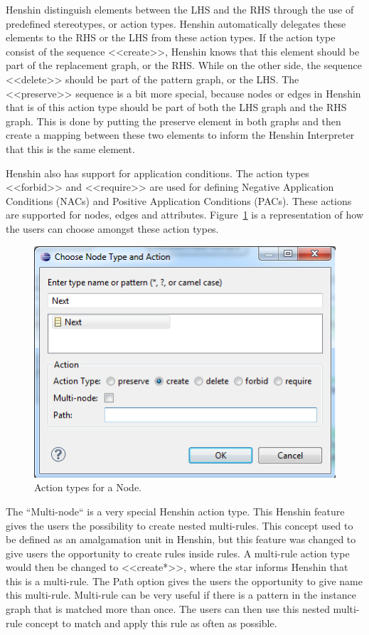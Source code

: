 Henshin distinguish elements between the LHS and the RHS through the
use of predefined stereotypes, or action types. Henshin automatically delegates
these elements to the RHS or the LHS from these action types. If the action type
consist of the sequence <<create>>, Henshin knows that this element should be
part of the replacement graph, or the RHS. While on the other side, the sequence
<<delete>> should be part of the pattern graph, or the LHS. The <<preserve>>
sequence is a bit more special, because nodes or edges in Henshin that is of
this action type should be part of both the LHS graph and the RHS graph. This is
done by putting the preserve element in both graphs and then create a mapping
between these two elements to inform the Henshin Interpreter that this is the
same element.

Henshin also has support for application conditions. The action types <<forbid>>
and <<require>> are used for defining Negative Application Conditions (NACs)
and Positive Application Conditions (PACs). These actions are supported for
nodes, edges and attributes. Figure~\ref{fig:HenshinAction} is a representation
of how the users can choose amongst these action types.  

\begin{figure}[H]
	\centering
	\includegraphics[scale=0.5]{figures/Henshin_Action.png}
	\caption[Action type for Henshin]
	{Action types for a Node.}
	\label{fig:HenshinAction}
\end{figure}

The ``Multi-node`` is a very special Henshin action type. This Henshin
feature gives the users the possibility to create nested multi-rules. This
concept used to be defined as an amalgamation unit in Henshin, but this feature
was changed to give users the opportunity to create rules inside rules. A
multi-rule action type would then be changed to <<create*>>, where the star
informs Henshin that this is a multi-rule. The Path option gives the users
the opportunity to give name this multi-rule. Multi-rule can be very useful if
there is a pattern in the instance graph that is matched more than once. The
users can then use this nested multi-rule concept to match and apply this rule
as often as possible.

